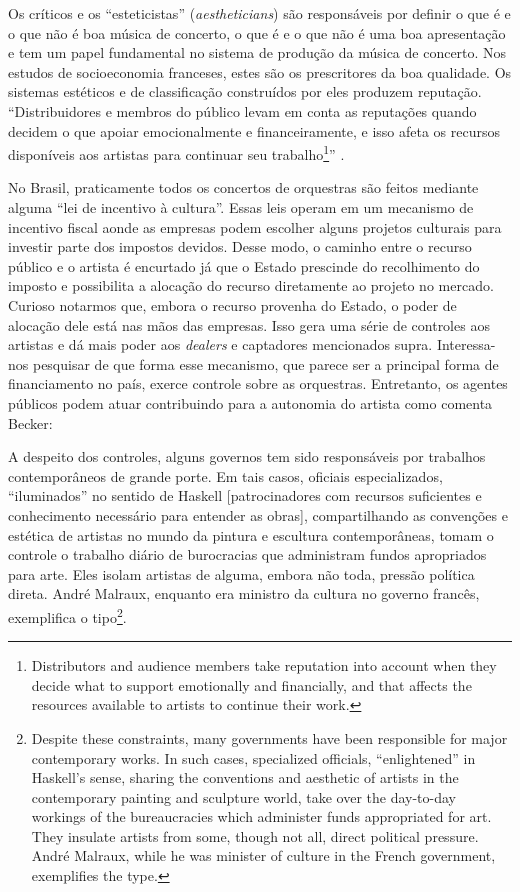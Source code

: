 \documentclass[a4paper, 12pt, openright, oneside, german, french, english, brazil]{abntex2}
\begin{document}
	Os críticos e os ``esteticistas'' (\textit{aestheticians}) são responsáveis por definir o que é e o que não é boa música de concerto, o que é e o que não é uma boa apresentação e tem um papel fundamental no sistema de produção da música de concerto. Nos estudos de socioeconomia franceses, estes são os prescritores da boa qualidade. Os sistemas estéticos e de classificação construídos por eles produzem reputação. ``Distribuidores e membros do público levam em conta as reputações quando decidem o que apoiar emocionalmente e financeiramente, e isso afeta os recursos disponíveis aos artistas para continuar seu trabalho\footnote{Distributors and audience members take reputation into account when they decide what to support emotionally and financially, and that affects the resources available to artists to continue their work.}'' \cite[p. 131]{becker2008art}. 
	
	No Brasil, praticamente todos os concertos de orquestras são feitos mediante alguma ``lei de incentivo à cultura''. Essas leis operam em um mecanismo de incentivo fiscal aonde as empresas podem escolher alguns projetos culturais para investir parte dos impostos devidos. Desse modo, o caminho entre o recurso público e o artista é encurtado já que o Estado prescinde do recolhimento do imposto e possibilita a alocação do recurso diretamente ao projeto no mercado. Curioso notarmos que, embora o recurso provenha do Estado, o poder de alocação dele está nas mãos das empresas. Isso gera uma série de controles aos artistas e dá mais poder aos \textit{dealers} e captadores mencionados supra. Interessa-nos pesquisar de que forma esse mecanismo, que parece ser a principal forma de financiamento no país, exerce controle sobre as orquestras. Entretanto, os agentes públicos podem atuar contribuindo para a autonomia do artista como comenta Becker:
	
	\begin{citacao}
		A despeito dos controles, alguns governos tem sido responsáveis por trabalhos contemporâneos de grande porte. Em tais casos, oficiais especializados, ``iluminados'' no sentido de Haskell [patrocinadores com recursos suficientes e conhecimento necessário para entender as obras], compartilhando as convenções e estética de artistas no mundo da pintura e escultura contemporâneas, tomam o controle o trabalho diário de burocracias que administram fundos apropriados para arte. Eles isolam artistas de alguma, embora não toda, pressão política direta. André Malraux, enquanto era ministro da cultura no governo francês, exemplifica o tipo\footnote{Despite these constraints, many governments have been responsible for major contemporary works. In such cases, specialized officials, ``enlightened'' in Haskell’s sense, sharing the conventions and aesthetic of artists in the contemporary painting and sculpture world, take over the day-to-day workings of the bureaucracies which administer funds appropriated for art. They insulate artists from some, though not all, direct political pressure. André Malraux, while he was minister of culture in the French government, exemplifies the type.}. \cite[p. 105]{becker2008art}
	\end{citacao}
	
\end{document}
